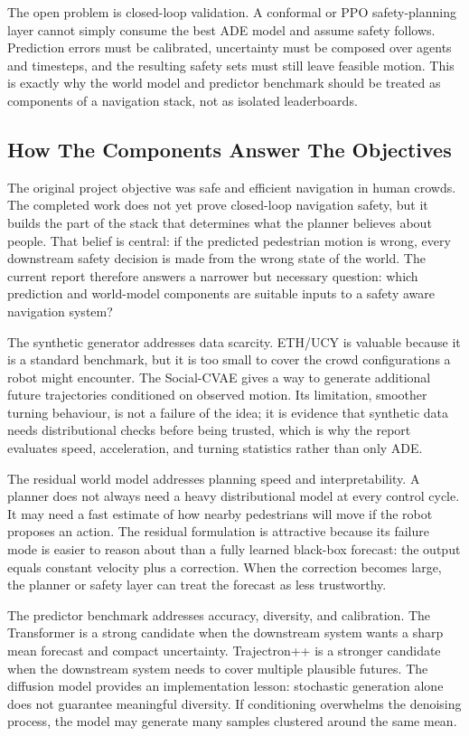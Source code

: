 \documentclass[conference]{IEEEtran}
\begin{document}
The open problem is closed-loop validation. A conformal or PPO safety-planning
layer cannot simply consume the best ADE model and assume safety follows.
Prediction errors must be calibrated, uncertainty must be composed over agents
and timesteps, and the resulting safety sets must still leave feasible motion.
This is exactly why the world model and predictor benchmark should be treated
as components of a navigation stack, not as isolated leaderboards.

\subsection{How The Components Answer The Objectives}

The original project objective was safe and efficient navigation in human
crowds. The completed work does not yet prove closed-loop navigation safety,
but it builds the part of the stack that determines what the planner believes
about people. That belief is central: if the predicted pedestrian motion is
wrong, every downstream safety decision is made from the wrong state of the
world. The current report therefore answers a narrower but necessary question:
which prediction and world-model components are suitable inputs to a safety
aware navigation system?

The synthetic generator addresses data scarcity. ETH/UCY is valuable because it
is a standard benchmark, but it is too small to cover the crowd configurations a
robot might encounter. The Social-CVAE gives a way to generate additional
future trajectories conditioned on observed motion. Its limitation, smoother
turning behaviour, is not a failure of the idea; it is evidence that synthetic
data needs distributional checks before being trusted, which is why the report
evaluates speed, acceleration, and turning statistics rather than only ADE.

The residual world model addresses planning speed and interpretability. A
planner does not always need a heavy distributional model at every control
cycle. It may need a fast estimate of how nearby pedestrians will move if the
robot proposes an action. The residual formulation is attractive because its
failure mode is easier to reason about than a fully learned black-box forecast:
the output equals constant velocity plus a correction. When the correction
becomes large, the planner or safety layer can treat the forecast as less
trustworthy.

The predictor benchmark addresses accuracy, diversity, and calibration. The
Transformer is a strong candidate when the downstream system wants a sharp mean
forecast and compact uncertainty. Trajectron++ is a stronger candidate when the
downstream system needs to cover multiple plausible futures. The diffusion
model provides an implementation lesson: stochastic generation alone does
not guarantee meaningful diversity. If conditioning overwhelms the denoising
process, the model may generate many samples clustered around the same mean.
\end{document}
